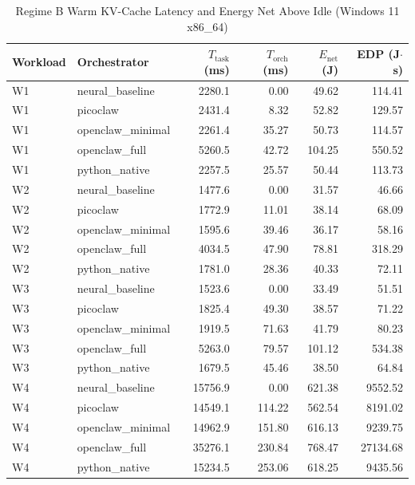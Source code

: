 \begin{table}[t]
\centering\small
\caption{Regime B Warm KV-Cache Latency and Energy Net Above Idle (Windows 11 x86_64)}
\label{tab:Windows_warm_cache}
\begin{tabular}{llrrrr}
\toprule
Workload & Orchestrator & $T_{\text{task}}$ (ms) & $T_{\text{orch}}$ (ms) & $E_{\text{net}}$ (J) & EDP (J$\cdot$s) \\
\midrule
W1 & neural\_baseline & 2280.1 & 0.00 & 49.62 & 114.41 \\
W1 & picoclaw & 2431.4 & 8.32 & 52.82 & 129.57 \\
W1 & openclaw\_minimal & 2261.4 & 35.27 & 50.73 & 114.57 \\
W1 & openclaw\_full & 5260.5 & 42.72 & 104.25 & 550.52 \\
W1 & python\_native & 2257.5 & 25.57 & 50.44 & 113.73 \\
W2 & neural\_baseline & 1477.6 & 0.00 & 31.57 & 46.66 \\
W2 & picoclaw & 1772.9 & 11.01 & 38.14 & 68.09 \\
W2 & openclaw\_minimal & 1595.6 & 39.46 & 36.17 & 58.16 \\
W2 & openclaw\_full & 4034.5 & 47.90 & 78.81 & 318.29 \\
W2 & python\_native & 1781.0 & 28.36 & 40.33 & 72.11 \\
W3 & neural\_baseline & 1523.6 & 0.00 & 33.49 & 51.51 \\
W3 & picoclaw & 1825.4 & 49.30 & 38.57 & 71.22 \\
W3 & openclaw\_minimal & 1919.5 & 71.63 & 41.79 & 80.23 \\
W3 & openclaw\_full & 5263.0 & 79.57 & 101.12 & 534.38 \\
W3 & python\_native & 1679.5 & 45.46 & 38.50 & 64.84 \\
W4 & neural\_baseline & 15756.9 & 0.00 & 621.38 & 9552.52 \\
W4 & picoclaw & 14549.1 & 114.22 & 562.54 & 8191.02 \\
W4 & openclaw\_minimal & 14962.9 & 151.80 & 616.13 & 9239.75 \\
W4 & openclaw\_full & 35276.1 & 230.84 & 768.47 & 27134.68 \\
W4 & python\_native & 15234.5 & 253.06 & 618.25 & 9435.56 \\
\bottomrule
\end{tabular}
\end{table}
